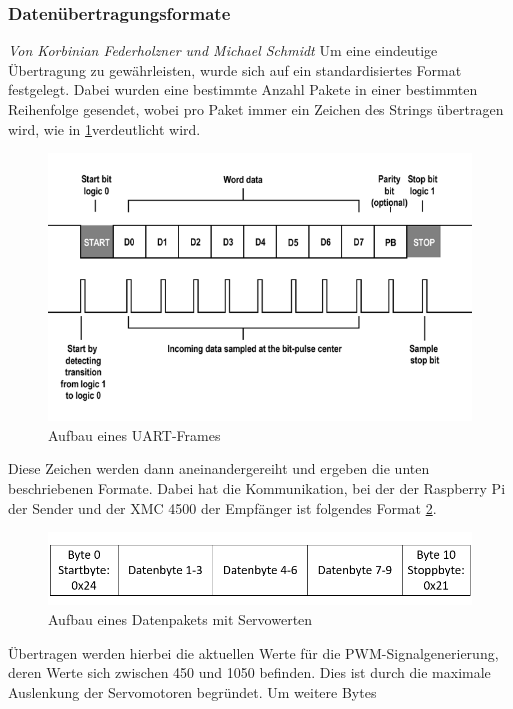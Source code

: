 \documentclass[12pt,a4paper,bibliography=totoc,listof=totoc]{scrartcl}
\begin{document}
\subsubsection{Datenübertragungsformate}
\textit{Von Korbinian Federholzner und Michael Schmidt}\newline
Um eine eindeutige Übertragung zu gewährleisten, wurde sich auf ein standardisiertes Format festgelegt. 
Dabei wurden eine bestimmte Anzahl Pakete in einer bestimmten Reihenfolge gesendet, wobei pro Paket immer 
ein Zeichen des Strings übertragen wird, wie in \ref{UARTFrame}verdeutlicht wird.
\begin{figure}[htbp]
	\centering
	\includegraphics[scale = 0.5]{pics/Uartframe}
	\caption{Aufbau eines UART-Frames\cite {electricimp}}
	\label{UARTFrame}
\end{figure}
Diese Zeichen werden dann aneinandergereiht und ergeben die unten beschriebenen Formate. Dabei hat die 
Kommunikation, bei der der Raspberry Pi der Sender und der XMC 4500 der Empfänger ist folgendes Format 
\ref{UART Servo}.
\begin{figure}[htbp]
	\centering
	\includegraphics[scale = 0.5]{pics/Uartservo}
	\caption{Aufbau eines Datenpakets mit Servowerten}
	\label{UART Servo}
\end{figure}
Übertragen werden hierbei die aktuellen Werte für die PWM-Signalgenerierung, deren Werte sich zwischen 
450 und 1050 befinden. Dies ist durch die maximale Auslenkung der Servomotoren begründet. Um weitere Bytes 
\end{document}
